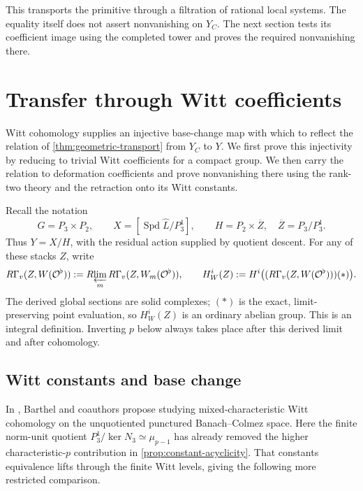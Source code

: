 \documentclass[11pt]{article}
\numberwithin{equation}{section}
\theoremstyle{definition}
\theoremstyle{remark}
\newcommand{\cO}{\mathcal O}
\DeclareMathOperator{\Spd}{Spd}
\newcommand{\Rlim}{R\!\varprojlim}
\begin{document}
This transports the primitive through a filtration of rational local
systems.  The equality itself does not assert nonvanishing on $Y_C$.
The next section tests its coefficient image using the completed
tower and proves the required nonvanishing there.

\section{Transfer through Witt coefficients}
\label{sec:witt-transfer}

Witt cohomology supplies an injective base-change map with which to
reflect the relation of \cref{thm:geometric-transport} from $Y_C$ to
$Y$. We first prove this injectivity by reducing to trivial Witt
coefficients for a compact group. We then carry the relation to
deformation coefficients and prove nonvanishing there using the
rank-two theory and the retraction onto its Witt constants.

Recall the notation
\[
 G=P_3\times P_2,\qquad
 X=[\Spd\widehat L/P_3^1],\qquad
 H=P_2\times\overline Z,
 \quad \overline Z=P_3/P_3^1.
\]
Thus $Y=X/H$, with the residual action supplied by quotient
descent.  For any of these stacks $Z$, write
\[
 R\Gamma_v(Z,W(\cO^\flat))
   :=\Rlim_m R\Gamma_v(Z,W_m(\cO^\flat)),
 \qquad
 H_W^i(Z):=H^i\bigl((R\Gamma_v(Z,W(\cO^\flat)))(*)\bigr).
\]
The derived global sections are solid complexes; \((*)\) is the exact,
limit-preserving point evaluation, so \(H_W^i(Z)\) is an ordinary abelian
group. This is an integral definition. Inverting $p$ below always takes
place after this derived limit and after cohomology.

\subsection{Witt constants and base change}

In \cite[Remark~3.6.12(2)]{BMR2026}, Barthel and coauthors propose
studying mixed-characteristic Witt cohomology on the unquotiented
punctured Banach--Colmez space. Here the finite norm-unit quotient
$P_3^1/\ker N_3\simeq\mu_{p-1}$ has already removed the higher
characteristic-$p$ contribution in \cref{prop:constant-acyclicity}.
That constants equivalence lifts through the finite Witt levels,
giving the following more restricted comparison.
\end{document}

